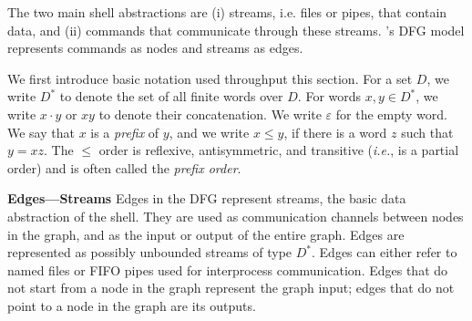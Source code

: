 \documentclass[letterpaper,twocolumn,10pt]{article}
\newcommand{\ie}{{\em i.e.}, }
\newcommand{\heading}[1]{\vspace{4pt}\noindent\textbf{#1}\enspace}
\newcommand{\TODO}[1]{\hl{\textbf{TODO:} #1}\xspace}
\newcommand{\nv}[1]{[{\color{cyan}nv: #1}]}
\newcommand{\tr}[1]{} %
\newcommand{\kstar}{^{\textstyle *}}
\newcommand{\eps}{\varepsilon}
\begin{document}
The two main shell abstractions are
  (i) streams, i.e. files or pipes, that contain data, and
  (ii) commands that communicate through these streams.
\sys's DFG model represents commands as nodes and streams as edges.

We first introduce basic notation used throughput this section.
For a set $D$, we write $D\kstar$ to denote the set of all finite words over $D$.
For words $x, y \in D\kstar$, we write $x \cdot y$ or $xy$ to denote their concatenation.
We write $\eps$ for the empty word.
We say that $x$ is a \emph{prefix} of $y$, and we write $x \leq y$, if there is a word $z$ such that $y = xz$.
The $\leq$ order is reflexive, antisymmetric, and transitive (\ie is a partial order) and is often called the \emph{prefix order}.


\heading{Edges---Streams}
Edges in the DFG represent streams, the basic data abstraction of the shell.
They are used as communication channels between nodes in the graph, and as the input or output of the entire graph.
Edges are represented as possibly unbounded streams of type $D\kstar$.
Edges can either refer to named files or FIFO pipes used for interprocess communication.
Edges that do not start from a node in the graph represent the graph input;
  edges that do not point to a node in the graph are its outputs.





\end{document}
